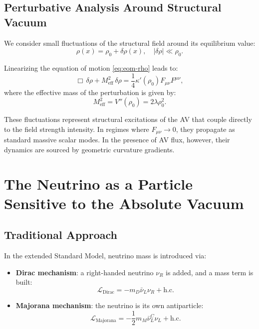 \documentclass[twoside]{article}
\theoremstyle{definition}
\theoremstyle{remark}
\numberwithin{equation}{section}
\theoremstyle{definition}
\theoremstyle{example}
\theoremstyle{remark}
\numberwithin{equation}{section}%
\begin{document}
\subsection*{Perturbative Analysis Around Structural Vacuum}

We consider small fluctuations of the structural field around its equilibrium value:
\begin{equation}
	\rho(x) = \rho_0 + \delta\rho(x), \quad |\delta\rho| \ll \rho_0.
\end{equation}

Linearizing the equation of motion \eqref{eq:eom-rho} leads to:
\begin{equation}
	\Box\, \delta\rho + M_{\text{eff}}^2\, \delta\rho = \frac{1}{4} \kappa'(\rho_0) F_{\mu\nu} F^{\mu\nu},
\end{equation}
where the effective mass of the perturbation is given by:
\begin{equation}
	M_{\text{eff}}^2 = V''(\rho_0) = 2 \lambda \rho_0^2.
\end{equation}

These fluctuations represent structural excitations of the AV that couple directly to the field strength intensity. In regimes where \( F_{\mu\nu} \rightarrow 0 \), they propagate as standard massive scalar modes. In the presence of AV flux, however, their dynamics are sourced by geometric curvature gradients.


	
	\section{The Neutrino as a Particle Sensitive to the Absolute Vacuum}
	
	\subsection{Traditional Approach}
	
	In the extended Standard Model, neutrino mass is introduced via:
	
	\begin{itemize}
		\item \textbf{Dirac mechanism}: a right-handed neutrino \(\nu_R\) is added, and a mass term is built:
		\begin{equation}
			\mathcal{L}_{\text{Dirac}} = - m_D \bar{\nu}_L \nu_R + \text{h.c.}
		\end{equation}
		\item \textbf{Majorana mechanism}: the neutrino is its own antiparticle:
		\begin{equation}
			\mathcal{L}_{\text{Majorana}} = - \frac{1}{2} m_M \bar{\nu}_L^C \nu_L + \text{h.c.}
		\end{equation}
	\end{itemize}
	
\end{document}
